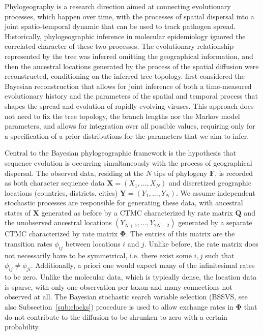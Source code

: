 Phylogeography is a research direction aimed at connecting evolutionary processes, which happen over time, with the processes of spatial dispersal into a joint spatio-temporal dynamic that can be used to track pathogen spread.
Historically, phylogeographic inference in molecular epidemiology ignored the correlated character of these two processes. 
The evolutionary relationship represented by the tree was inferred omitting the geographical information, and then the ancestral locations generated by the process of the spatial diffusion were reconstructed, conditioning on the inferred tree topology.
\citet{Lemey2009} first considered the Bayesian reconstruction that allows for joint inference of both a time-measured evolutionary history and the parameters of the spatial and temporal process that shapes the spread and evolution of 
rapidly evolving viruses.
This approach does not need to fix the tree topology, the branch lengths nor the Markov model parameters, and allows for integration over all possible values, requiring only for a specification of a prior distributions for the parameters that we aim to infer.

Central to the Bayesian phylogeographic framework is the hypothesis that sequence evolution is occurring simultaneously with the process of geographical dispersal. 
The observed data, residing at the $N$ tips of phylogeny $\mathbf{F}$, is recorded as both character sequence data $\mathbf{X}=(X_{1},...,X_{N})$ and discretized geographic locations (countries, districts, cities) $\mathbf{Y}=(Y_{1},...,Y_{N})$.
We assume independent stochastic processes are responsible for generating these data, with ancestral states of $\mathbf{X}$ generated as before by a CTMC characterized by rate matrix $\mathbf{Q}$ and the unobserved ancestral locations $(Y_{N+1},...,Y_{2N-2})$ generated by a separate CTMC characterized by rate matrix $\mathbf{\Phi}$.
The entries of this matrix are the transition rates $\phi_{ij}$ between locations $i$ and $j$.
Unlike before, the rate matrix does not necessarily have to be symmetrical, i.e. there exist some $i,j$ such that $\phi_{ij}\neq\phi_{ji}$.
Additionally, a priori one would expect many of the infinitesimal rates to be zero. 
Unlike the molecular data, which is typically dense, the location data is sparse, with only one observation per taxon and many connections not observed at all.
The Bayesian stochastic search variable selection (BSSVS, see also Subsection~\ref{sub:clocks}) procedure is used to allow exchange rates in $\mathbf{\Phi}$ that do not contribute to the diffusion to be shrunken to zero with a certain probability.

